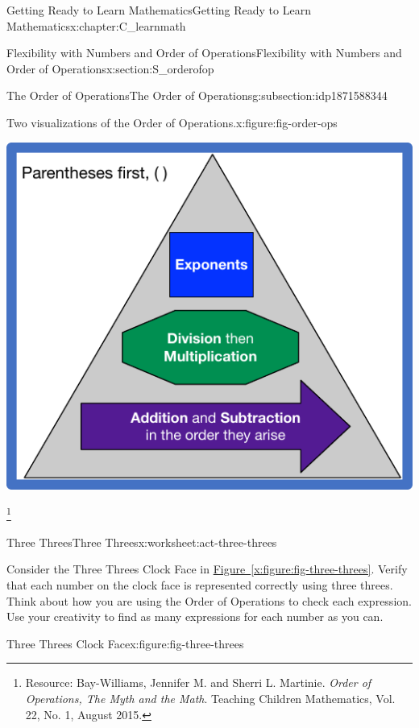 \documentclass[oneside,10pt,]{book}
\newcommand{\xreffont}{\relax}
\newcommand{\pubtitle}[1]{\textsl{#1}}
\numberwithin{equation}{chapter}
\begin{document}
\begin{chapterptx}{Getting Ready to Learn Mathematics}{}{Getting Ready to Learn Mathematics}{}{}{x:chapter:C_learnmath}
\begin{sectionptx}{Flexibility with Numbers and Order of Operations}{}{Flexibility with Numbers and Order of Operations}{}{}{x:section:S_orderofop}
\begin{subsectionptx}{The Order of Operations}{}{The Order of Operations}{}{}{g:subsection:idp1871588344}
\begin{figureptx}{Two visualizations of the Order of Operations.}{x:figure:fig-order-ops}{}
\begin{sidebyside}{2}{0}{0}{0}
\begin{sbspanel}{0.5}
\includegraphics[width=\linewidth]{external/order-ops-pyr.pdf}
\end{sbspanel}%
\end{sidebyside}%
\tcblower
\end{figureptx}%
 \footnote{Resource: Bay-Williams, Jennifer M. and Sherri L. Martinie. \pubtitle{Order of Operations, The Myth and the Math}. Teaching Children Mathematics, Vol. 22, No. 1, August 2015.\label{g:fn:idp1871612792}}%
\end{subsectionptx}
%
%
\typeout{************************************************}
\typeout{************************************************}
%
\begin{worksheet-subsection}{Three Threes}{}{Three Threes}{}{}{x:worksheet:act-three-threes}
\begin{introduction}{}%
Consider the Three Threes Clock Face in \hyperref[x:figure:fig-three-threes]{Figure~{\xreffont\ref{x:figure:fig-three-threes}}}. Verify that each number on the clock face is represented correctly using three threes. Think about how you are using the Order of Operations to check each expression. Use your creativity to find as many expressions for each number as you can.%
\begin{figureptx}{Three Threes Clock Face}{x:figure:fig-three-threes}{}%
\begin{image}{0.25}{0.5}{0.25}%

\end{image}
\end{figureptx}
\end{introduction}
\end{worksheet-subsection}
\end{sectionptx}
\end{chapterptx}
\end{document}
